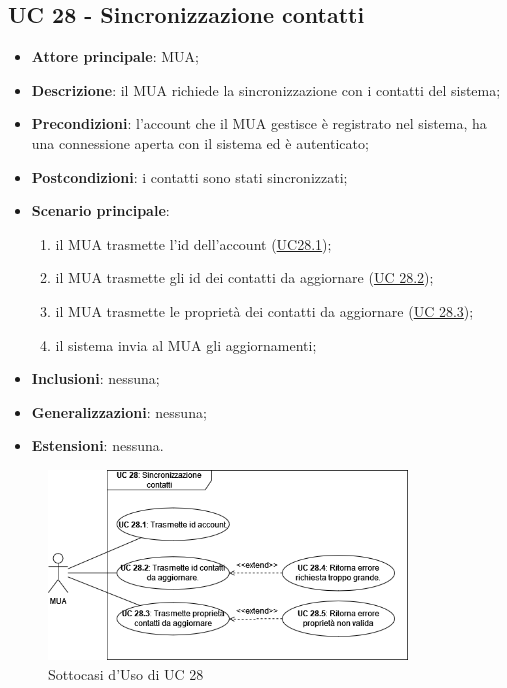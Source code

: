 
\subsection{UC 28 - Sincronizzazione contatti} \label{sec:UC28}
    
    \begin{itemize}
        \item \textbf{Attore principale}: MUA;
        \item \textbf{Descrizione}: il MUA richiede la sincronizzazione con i contatti del sistema;
        \item \textbf{Precondizioni}: l’account che il MUA gestisce è registrato nel sistema, ha una connessione aperta con il sistema ed è autenticato;
        \item \textbf{Postcondizioni}: i contatti sono stati sincronizzati;
        \item \textbf{Scenario principale}:
            \begin{enumerate}
                \item il MUA trasmette l'id dell'account (\hyperref[sec:UC28.1]{UC28.1});
                \item il MUA trasmette gli id dei contatti da aggiornare (\hyperref[sec:UC28.2]{UC 28.2});
                \item il MUA trasmette le proprietà dei contatti da aggiornare (\hyperref[sec:UC28.3]{UC 28.3});
                \item il sistema invia al MUA gli aggiornamenti;
            \end{enumerate}
        \item \textbf{Inclusioni}: nessuna;
        \item \textbf{Generalizzazioni}: nessuna;
        \item \textbf{Estensioni}: nessuna.
    \end{itemize}

    \begin{figure}[H]
        \includegraphics[width=0.85\textwidth]{sections/uc_imgs/UC28.png}
        \centering
        \caption{Sottocasi d'Uso di UC 28}
    \end{figure}

